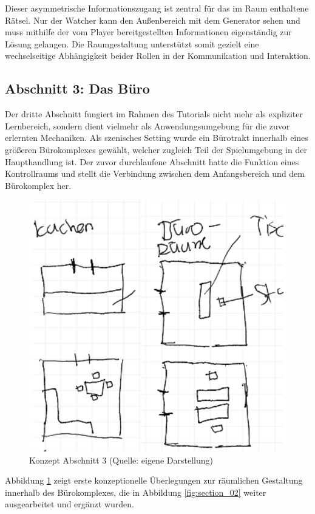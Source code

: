 Dieser asymmetrische Informationszugang ist zentral für das im Raum enthaltene Rätsel. Nur der Watcher kann den Außenbereich mit dem Generator sehen und muss mithilfe der vom Player bereitgestellten Informationen eigenständig zur Lösung gelangen. Die Raumgestaltung unterstützt somit gezielt eine wechselseitige Abhängigkeit beider Rollen in der Kommunikation und Interaktion.

\subsection{Abschnitt 3: Das Büro}

Der dritte Abschnitt fungiert im Rahmen des Tutorials nicht mehr als expliziter Lernbereich, sondern dient vielmehr als Anwendungsumgebung für die zuvor erlernten Mechaniken. Als szenisches Setting wurde ein Bürotrakt innerhalb eines größeren Bürokomplexes gewählt, welcher zugleich Teil der Spielumgebung in der Haupthandlung ist. Der zuvor durchlaufene Abschnitt hatte die Funktion eines Kontrollraums und stellt die Verbindung zwischen dem Anfangsbereich und dem Bürokomplex her.

\begin{figure}[ht]
\centering
\includegraphics[width=0.6\linewidth]{content/pictures/Abschnitt_02_Concept.png}
\caption{Konzept Abschnitt 3 (Quelle: eigene Darstellung)}
\label{fig:section_02_concept}
\end{figure}

Abbildung \ref{fig:section_02_concept} zeigt erste konzeptionelle Überlegungen zur räumlichen Gestaltung innerhalb des Bürokomplexes, die in Abbildung \ref{fig:section_02} weiter ausgearbeitet und ergänzt wurden.

